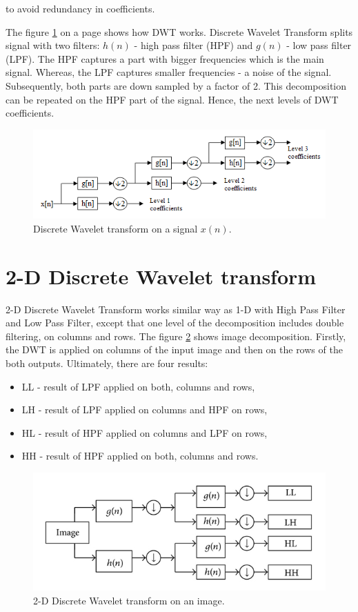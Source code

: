 to avoid redundancy in coefficients.


The figure \ref{fig:DWT} on a page \pageref{fig:DWT} shows how DWT works. Discrete Wavelet Transform splits signal with two filters: $h(n)$ - high pass filter (HPF) and $g(n)$ - low pass filter (LPF). The HPF captures a part with bigger frequencies which is the main signal. Whereas, the LPF captures smaller frequencies - a noise of the signal. Subsequently, both parts are down sampled by a factor of 2. This decomposition can be repeated on the HPF part of the signal. Hence, the next levels of DWT coefficients.

\begin{figure}[h]
	\centering
	\includegraphics[width=\textwidth]{DWT.png}
	\caption{Discrete Wavelet transform on a signal $x(n)$.}
	\label{fig:DWT}
\end{figure}


\section{2-D Discrete Wavelet transform}

2-D Discrete Wavelet Transform works similar way as 1-D with High Pass Filter and Low Pass Filter, except that one level of the decomposition includes double filtering, on columns and rows. The figure \ref{fig:2D_DWT} shows image decomposition. Firstly, the DWT is applied on columns of the input image and then on the rows of the both outputs. Ultimately, there are four results:

\begin{itemize}
\item LL - result of LPF applied on both, columns and rows,
\item LH - result of LPF applied on columns and HPF on rows,
\item HL - result of HPF applied on columns and LPF on rows,
\item HH - result of HPF applied on both, columns and rows.
\end{itemize}  

\begin{figure}[h]
	\centering
	\includegraphics[width=\textwidth]{2D_DWT.JPG}
	\caption{2-D Discrete Wavelet transform on an image.}
	\label{fig:2D_DWT}
\end{figure}

